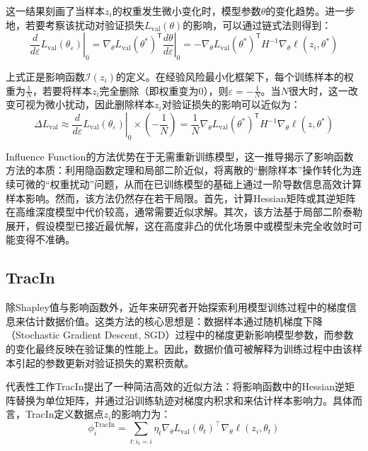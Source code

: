 \documentclass[12pt,a4paper]{ctexart}
\theoremstyle{definition}
\theoremstyle{plain}
\begin{document}
这一结果刻画了当样本$z_i$的权重发生微小变化时，模型参数$\theta$的变化趋势。进一步地，若要考察该扰动对验证损失$L_{\mathrm{val}}(\theta)$的影响，可以通过链式法则得到：
\begin{equation}
\left.\frac{d}{d\varepsilon} L_{\mathrm{val}}(\theta_{\varepsilon})\right|_{0} = \nabla_{\theta} L_{\mathrm{val}}(\theta^{*})^{\mathsf{T}} \left.\frac{d\theta}{d\varepsilon}\right|_{0}=-\nabla_{\theta} L_{\mathrm{val}}(\theta^{*})^{\mathsf{T}} H^{-1} \nabla_{\theta} \ell(z_i,\theta^{*})
\end{equation}

上式正是影响函数$\mathcal{I}(z_i)$的定义。在经验风险最小化框架下，每个训练样本的权重为$\frac{1}{N}$，若要将样本$z_i$完全删除（即权重变为0），则$\varepsilon=-\frac{1}{N}$。当$N$很大时，这一改变可视为微小扰动，因此删除样本$z_i$对验证损失的影响可以近似为：
\begin{equation}
\Delta L_{\mathrm{val}} \approx \left.\frac{d}{d\varepsilon} L_{\mathrm{val}}(\theta_{\varepsilon})\right|_{0} \times \left(-\frac{1}{N}\right)=\frac{1}{N} \nabla_{\theta} L_{\mathrm{val}}(\theta^{*})^{\mathsf{T}} H^{-1} \nabla_{\theta} \ell(z,\theta^{*})
\label{eq:influence}
\end{equation}

Influence Function的方法优势在于无需重新训练模型，这一推导揭示了影响函数方法的本质：利用隐函数定理和局部二阶近似，将离散的“删除样本”操作转化为连续可微的“权重扰动”问题，从而在已训练模型的基础上通过一阶导数信息高效计算样本影响。然而，该方法仍然存在若干局限。首先，计算Hessian矩阵或其逆矩阵在高维深度模型中代价较高，通常需要近似求解。其次，该方法基于局部二阶泰勒展开，假设模型已接近最优解，这在高度非凸的优化场景中或模型未完全收敛时可能变得不准确。

\subsection{TracIn}
除Shapley值与影响函数外，近年来研究者开始探索利用模型训练过程中的梯度信息来估计数据价值。这类方法的核心思想是：数据样本通过随机梯度下降（Stochastic Gradient Descent, SGD）过程中的梯度更新影响模型参数，而参数的变化最终反映在验证集的性能上。因此，数据价值可被解释为训练过程中由该样本引起的参数更新对验证损失的累积贡献。

代表性工作TracIn\cite{TracIn}提出了一种简洁高效的近似方法：将影响函数中的Hessian逆矩阵替换为单位矩阵，并通过沿训练轨迹对梯度内积求和来估计样本影响力。具体而言，TracIn定义数据点$z_i$的影响力为：
\begin{equation}
\phi_i^{\mathrm{TracIn}} = \sum_{t: i_t = i} \eta_t \nabla_{\theta} L_{\mathrm{val}}(\theta_t)^{\top} \nabla_{\theta} \ell(z_i, \theta_t)
\label{eq:tracin}
\end{equation}
\end{document}
